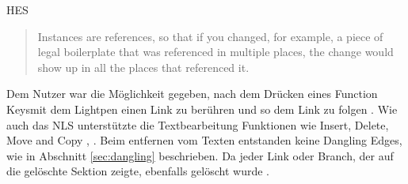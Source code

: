 \begin{section}{HES}
\begin{quote}
\glqq Instances are references, so that if you changed, for example, a piece of legal boilerplate that was referenced in multiple places, the change would show up in all the places that referenced it. \grqq{ }\cite{Dam1988}
\end{quote}

Dem Nutzer war die Möglichkeit gegeben, nach dem Drücken eines \glqq Function Keys\grqq{ }mit dem Lightpen einen Link zu berühren und so dem Link zu folgen \cite[S.23]{Dam1969}. Wie auch das NLS unterstützte die Textbearbeitung Funktionen wie Insert, Delete, Move and Copy \cite[S.10-14]{Dam1969}, \cite[S. 889]{Dam1988}. Beim entfernen vom Texten entstanden keine Dangling Edges, wie in Abschnitt \ref{sec:dangling} beschrieben. Da jeder Link oder Branch, der auf die gelöschte Sektion zeigte, ebenfalls gelöscht wurde \cite[S.12]{Dam1969}.

\end{section}

